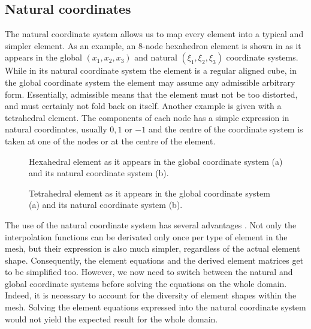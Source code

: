	\subsection{Natural coordinates}
The natural coordinate system allows us to map every element into a typical and simpler element. As an example, an 8-node hexahedron element is shown in  as it appears in the global $(x_1, x_2, x_3)$ and natural $(\xi_1,\xi_2,\xi_3)$ coordinate systems. While in its natural coordinate system the element is a regular aligned cube, in the global coordinate system the element may assume any admissible arbitrary form. Essentially, admissible means that the element must not be too distorted, and must certainly not fold back on itself. Another example is given  with a tetrahedral element. The components of each node has a simple expression in natural coordinates, usually $0, 1$ or $-1$ and the centre of the coordinate system is taken at one of the nodes or at the centre of the element. 
%
\begin{figure}[ht]
\centering 
{}
\hspace{1cm}
\caption[Natural coordinates of a hexaedron]{Hexahedral element as it appears in the global coordinate system (a) and its natural coordinate system (b).}
\label{chap3:fig-naturalCoordinatesHexa}
\end{figure}
%
\begin{figure}[ht]
\centering 
{}
\hspace{1cm}
\caption[Natural coordinates of a tetrahedron]{Tetrahedral element as it appears in the global coordinate system (a) and its natural coordinate system (b).}
\label{chap3:fig-naturalCoordinatesTetra}
\end{figure}


The use of the natural coordinate system has several advantages \citep{Biswas76}. Not only the interpolation functions can be derivated only once per type of element in the mesh, but their expression is also much simpler, regardless of the actual element shape. Consequently, the element equations and the derived element matrices get to be simplified too. However, we now need to switch between the natural and global coordinate systems before solving the equations on the whole domain. Indeed, it is necessary to account for the diversity of element shapes within the mesh. Solving the element equations expressed into the natural coordinate system would not yield the expected result for the whole domain. 
	
